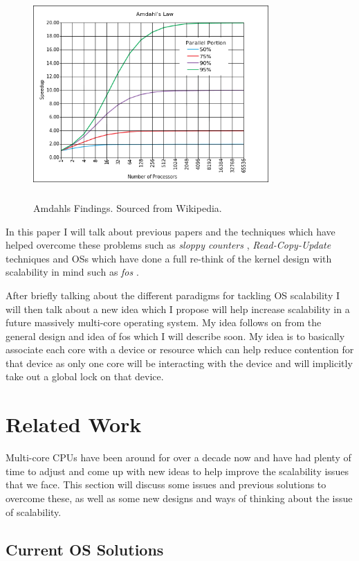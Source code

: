 \documentclass[journal]{IEEEtran}
\begin{document}
\begin{figure}
\includegraphics[width =9cm, height =8cm]{Amdahl.png}
\caption{Amdahls Findings. Sourced from Wikipedia.}
\label{AmdahlGraph}
\end{figure}

In this paper I will talk about previous papers and the techniques which have helped overcome these problems such as \emph{sloppy counters} \cite{sloppy-counters}, \emph{Read-Copy-Update} techniques \cite{RCU} and OSs which have done a full re-think of the kernel design with scalability in mind such as \emph{fos} \cite{fos}.

After briefly talking about the different paradigms for tackling OS scalability I will then talk about a new idea which I propose will help increase scalability in a future massively multi-core operating system. My idea follows on from the general design and idea of fos which I will describe soon. My idea is to basically associate each core with a device or resource which can help reduce contention for that device as only one core will be interacting with the device and will implicitly take out a global lock on that device.

\section{Related Work}

Multi-core CPUs have been around for over a decade now and have had plenty of time to adjust and come up with new ideas to help improve the scalability issues that we face. This section will discuss some issues and previous solutions to overcome these, as well as some new designs and ways of thinking about the issue of scalability. 

\subsection{Current OS Solutions}
\end{document}
